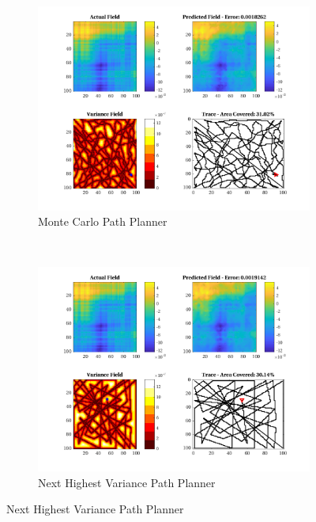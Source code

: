 \begin{figure}[htb!]
    \centering
    \begin{subfigure}[t]{0.5\textwidth}
        \centering
        \includegraphics[width=\linewidth]{figures/hbresults/mc_30p_100x100_sf_50_seed_3.png}
        \captionsetup{skip=0.10\baselineskip,size=footnotesize}
        \caption{Monte Carlo Path Planner}
    \end{subfigure}%
    ~ 
    \begin{subfigure}[t]{0.5\textwidth}
        \centering
        \includegraphics[width=\linewidth]{figures/hbresults/nhv_30p_100x100_sf_50_seed_3.png}
        \captionsetup{skip=0.10\baselineskip,size=footnotesize}
        \caption{Next Highest Variance Path Planner}

\end{subfigure}
\end{figure}
